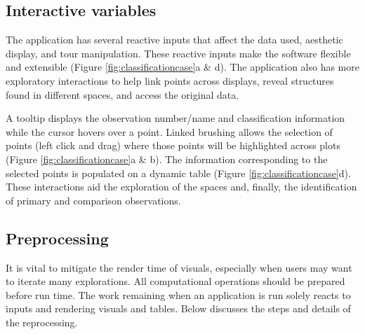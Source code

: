 \documentclass[
]{jss}
\begin{document}
\hypertarget{interactive-variables}{%
\subsection{Interactive variables}\label{interactive-variables}}

The application has several reactive inputs that affect the data used,
aesthetic display, and tour manipulation. These reactive inputs make the
software flexible and extensible (Figure \ref{fig:classificationcase}a
\& d). The application also has more exploratory interactions to help
link points across displays, reveal structures found in different
spaces, and access the original data.

A tooltip displays the observation number/name and classification
information while the cursor hovers over a point. Linked brushing allows
the selection of points (left click and drag) where those points will be
highlighted across plots (Figure \ref{fig:classificationcase}a \& b).
The information corresponding to the selected points is populated on a
dynamic table (Figure \ref{fig:classificationcase}d). These interactions
aid the exploration of the spaces and, finally, the identification of
primary and comparison observations.

\hypertarget{preprocessing}{%
\subsection{Preprocessing}\label{preprocessing}}

It is vital to mitigate the render time of visuals, especially when
users may want to iterate many explorations. All computational
operations should be prepared before run time. The work remaining when
an application is run solely reacts to inputs and rendering visuals and
tables. Below discusses the steps and details of the reprocessing.
\end{document}

